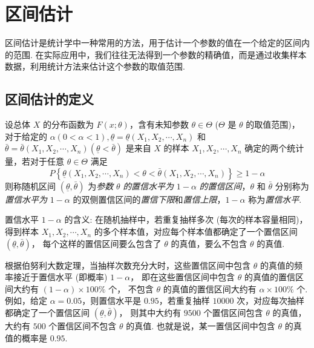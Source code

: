 \section{区间估计}

区间估计是统计学中一种常用的方法，用于估计一个参数的值在一个给定的区间内的范围.
在实际应用中，我们往往无法得到一个参数的精确值，而是通过收集样本数据，利用统计方法来估计这个参数的取值范围.

\subsection{区间估计的定义}

\begin{definition}[区间估计]
    设总体 $ X $ 的分布函数为 $ F(x ; \theta)$，含有未知参数 $ \theta \in \Theta$ ($\Theta $ 是 $ \theta $ 的取值范围)，
    对于给定的 $ \alpha(0<\alpha<1), \underline{\theta}=\underline{\theta}\left(X_{1}, X_{2}, \cdots, X_{n}\right) $ 和 $ \bar{\theta}=\bar{\theta}\left(X_{1}, X_{2}, \cdots, X_{n}\right)(\underline{\theta}<\bar{\theta}) $
    是来自 $ X $ 的样本 $ X_{1}, X_{2}, \cdots, X_{n} $ 确定的两个统计量，若对于任意 $ \theta \in \Theta $ 满足
    $$P\left\{\underline{\theta}\left(X_{1}, X_{2}, \cdots, X_{n}\right)<\theta<\bar{\theta}\left(X_{1}, X_{2}, \cdots, X_{n}\right)\right\} \geqslant 1-\alpha$$
    则称随机区间 $ (\underline{\theta}, \bar{\theta}) $ 为\textit{参数} $ \theta $ \textit{的置信水平为} $ 1-\alpha $ \textit{的置信区间}，$\theta $ 和 $ \bar{\theta} $
    分别称为\textit{置信水平为} $ 1-\alpha $ 的双侧置信区间的\textit{置信下限}和\textit{置信上限}，$1-\alpha $ 称为\textit{置信水平}.
\end{definition}

置信水平 $ 1-\alpha $ 的含义: 在随机抽样中，若重复抽样多次 (每次的样本容量相同)，
得到样本 $ X_{1}, X_{2}, \cdots, X_{n} $ 的多个样本值，对应每个样本值都确定了一个置信区间 $ (\underline{\theta}, \bar{\theta}) $，
每个这样的置信区间要么包含了 $ \theta $ 的真值，要么不包含 $ \theta $ 的真值.

根据伯努利大数定理，当抽样次数充分大时，这些置信区间中包含 $ \theta $ 的真值的频率接近于置信水平 (即概率) $ 1-\alpha $，
即在这些置信区间中包含 $ \theta $ 的真值的置信区间大约有 $ (1-\alpha) \times 100 \% $ 个，
不包含 $ \theta $ 的真值的置信区间大约有 $ \alpha \times 100 \% $ 个.
例如，给定 $ \alpha=0.05 $，则置信水平是 $0.95$，若重复抽样 $10000$ 次，对应每次抽样都确定了一个置信区间 $ (\underline{\theta}, \bar{\theta}) $，
则其中大约有 $9500$ 个置信区间包含 $ \theta $ 的真值，大约有 $500$ 个置信区间不包含 $ \theta $ 的真值.
也就是说，某一置信区间中包含 $ \theta $ 的真值的概率是 $0.95$.

